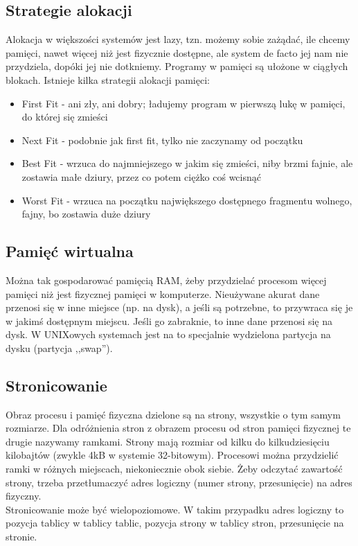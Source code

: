 \subsection{Strategie alokacji}
Alokacja w większości systemów jest lazy, tzn. możemy sobie zażądać, ile chcemy pamięci, nawet więcej niż jest fizycznie dostępne, ale system de facto jej nam nie przydziela, dopóki jej nie dotkniemy. Programy w pamięci są ułożone w ciągłych blokach. Istnieje kilka strategii alokacji pamięci:
\begin{itemize}
	\item First Fit - ani zły, ani dobry; ładujemy program w pierwszą lukę w pamięci, do której się zmieści
	\item Next Fit - podobnie jak first fit, tylko nie zaczynamy od początku
	\item Best Fit - wrzuca do najmniejszego w jakim się zmieści, niby brzmi fajnie, ale zostawia małe dziury, przez co potem ciężko coś wcisnąć
	\item Worst Fit - wrzuca na początku największego dostępnego fragmentu wolnego, fajny, bo zostawia duże dziury
\end{itemize}
\subsection{Pamięć wirtualna}
Można tak gospodarować pamięcią RAM, żeby przydzielać procesom więcej pamięci niż jest fizycznej pamięci w komputerze. Nieużywane akurat dane przenosi się w inne miejsce (np. na dysk), a jeśli są potrzebne, to przywraca się je w jakimś dostępnym miejscu. Jeśli go zabraknie, to inne dane przenosi się na dysk. W UNIXowych systemach jest na to specjalnie wydzielona partycja na dysku (partycja ,,swap'').
\subsection{Stronicowanie}
Obraz procesu i pamięć fizyczna dzielone są na strony, wszystkie o tym samym rozmiarze. Dla odróżnienia stron z obrazem procesu od stron pamięci fizycznej te drugie nazywamy ramkami. Strony mają rozmiar od kilku do kilkudziesięciu kilobajtów (zwykle 4kB w systemie 32-bitowym). Procesowi można przydzielić ramki w różnych miejscach, niekoniecznie obok siebie. Żeby odczytać zawartość strony, trzeba przetłumaczyć adres logiczny (numer strony, przesunięcie) na adres fizyczny. \\
Stronicowanie może być wielopoziomowe. W takim przypadku adres logiczny to pozycja tablicy w tablicy tablic, pozycja strony w tablicy stron, przesunięcie na stronie.
